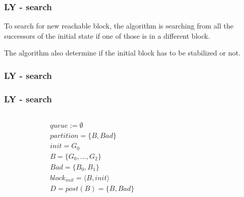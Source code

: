 \documentclass[11pt,handout]{beamer}
\begin{document}
\begin{frame}
  \frametitle{LY - search}
  To search for new reachable block, the algorithm is searching from all the
  successors of the initial state if one of those is in a different block.

  \pause
  \vspace*{1cm}

  The algorithm also determine if the initial block has to be stabilized or not.
\end{frame}

\begin{frame}[fragile]
  \frametitle{LY - search}
  \begin{algorithmic}
    \EndIf
     
    \EndIf
    \EndFor
     
    \EndIf
  \end{algorithmic}
\end{frame}

\begin{frame}[fragile]
  \frametitle{LY - search}
  \begin{columns}
    \begin{column}{0.5\textwidth}
      \begin{align*}
        & queue := \emptyset \\
        & partition = \{B, Bad\} \\
        & init = G_0 \\
        & B = \{G_0,\dots,G_2\}\\
        & Bad = \{B_0,B_1\} \\
        & block_{init} = \langle B,init \rangle \\
        & D = post(B) = \{ B,Bad \}
      \end{align*}
    \end{column}
    \begin{column}{0.5\textwidth}%
      
    \end{column}
  \end{columns}
\end{frame}
  
\end{document}
